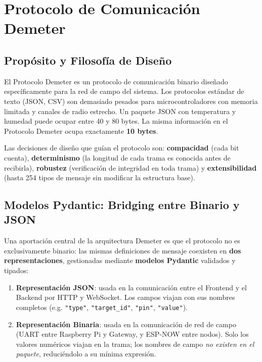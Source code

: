\chapter{Protocolo de Comunicación Demeter}
\label{sec:protocolo}

\section{Propósito y Filosofía de Diseño}

El Protocolo Demeter es un protocolo de comunicación binario diseñado específicamente para
la red de campo del sistema. Los protocolos estándar de texto (JSON, CSV) son demasiado
pesados para microcontroladores con memoria limitada y canales de radio estrecho. Un paquete
JSON con temperatura y humedad puede ocupar entre 40 y 80 bytes. La misma información en
el Protocolo Demeter ocupa exactamente \textbf{10 bytes}.

\begin{designnote}
Las decisiones de diseño que guían el protocolo son: \textbf{compacidad} (cada bit cuenta),
\textbf{determinismo} (la longitud de cada trama es conocida antes de recibirla),
\textbf{robustez} (verificación de integridad en toda trama) y
\textbf{extensibilidad} (hasta 254 tipos de mensaje sin modificar la estructura base).
\end{designnote}

\section{Modelos Pydantic: Bridging entre Binario y JSON}
\label{sec:pydantic}

Una aportación central de la arquitectura Demeter es que el protocolo no es exclusivamente
binario: las mismas definiciones de mensaje coexisten en \textbf{dos representaciones},
gestionadas mediante \textbf{modelos Pydantic} validados y tipados:

\begin{enumerate}
    \item \textbf{Representación JSON}: usada en la comunicación entre el Frontend y el
          Backend por HTTP y WebSocket. Los campos viajan con sus nombres completos
          (e.g. \texttt{"type"}, \texttt{"target\_id"}, \texttt{"pin"}, \texttt{"value"}).
    \item \textbf{Representación Binaria}: usada en la comunicación de red de campo
          (UART entre Raspberry Pi y Gateway, y ESP-NOW entre nodos). Solo los valores
          numéricos viajan en la trama; los nombres de campo \textit{no existen en el paquete},
          reduciéndolo a su mínima expresión.
\end{enumerate}


